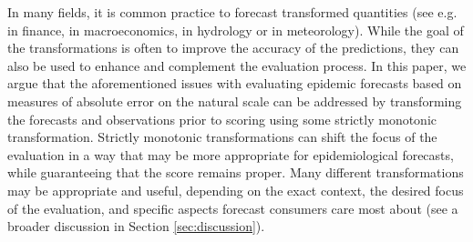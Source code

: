 \documentclass{article}
\begin{document}
In many fields, it is common practice to forecast transformed quantities (see e.g. \cite{taylorEvaluatingVolatilityInterval1999} in finance, \cite{mayrLogLevelVAR2015} in macroeconomics, \cite{loweStochasticRainfallrunoffForecasting2014} in hydrology or \cite{fuglstadDoesNonstationarySpatial2015} in meteorology). While the goal of the transformations is often to improve the accuracy of the predictions, they can also be used to enhance and complement the evaluation process. 
In this paper, we argue that the aforementioned issues with evaluating epidemic forecasts based on measures of absolute error on the natural scale can be addressed by transforming the forecasts and observations prior to scoring using some strictly monotonic transformation. Strictly monotonic transformations can shift the focus of the evaluation in a way that may be more appropriate for epidemiological forecasts, while guaranteeing that the score remains proper. Many different transformations may be appropriate and useful, depending on the exact context, the desired focus of the evaluation, and specific aspects forecast consumers care most about (see a broader discussion in Section \ref{sec:discussion}). 
\end{document}
